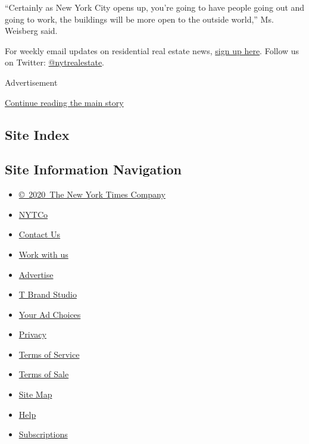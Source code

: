 ``Certainly as New York City opens up, you're going to have people going
out and going to work, the buildings will be more open to the outside
world,'' Ms. Weisberg said.

For weekly email updates on residential real estate news,
\href{http://www.nytimes3xbfgragh.onion/newsletters/realestate/}{sign up
here}. Follow us on Twitter:
\href{https://twitter.com/nytrealestate}{@nytrealestate}.

Advertisement

\protect\hyperlink{after-bottom}{Continue reading the main story}

\hypertarget{site-index}{%
\subsection{Site Index}\label{site-index}}

\hypertarget{site-information-navigation}{%
\subsection{Site Information
Navigation}\label{site-information-navigation}}

\begin{itemize}
\tightlist
\item
  \href{https://help.nytimes3xbfgragh.onion/hc/en-us/articles/115014792127-Copyright-notice}{©~2020~The
  New York Times Company}
\end{itemize}

\begin{itemize}
\tightlist
\item
  \href{https://www.nytco.com/}{NYTCo}
\item
  \href{https://help.nytimes3xbfgragh.onion/hc/en-us/articles/115015385887-Contact-Us}{Contact
  Us}
\item
  \href{https://www.nytco.com/careers/}{Work with us}
\item
  \href{https://nytmediakit.com/}{Advertise}
\item
  \href{http://www.tbrandstudio.com/}{T Brand Studio}
\item
  \href{https://www.nytimes3xbfgragh.onion/privacy/cookie-policy\#how-do-i-manage-trackers}{Your
  Ad Choices}
\item
  \href{https://www.nytimes3xbfgragh.onion/privacy}{Privacy}
\item
  \href{https://help.nytimes3xbfgragh.onion/hc/en-us/articles/115014893428-Terms-of-service}{Terms
  of Service}
\item
  \href{https://help.nytimes3xbfgragh.onion/hc/en-us/articles/115014893968-Terms-of-sale}{Terms
  of Sale}
\item
  \href{https://spiderbites.nytimes3xbfgragh.onion}{Site Map}
\item
  \href{https://help.nytimes3xbfgragh.onion/hc/en-us}{Help}
\item
  \href{https://www.nytimes3xbfgragh.onion/subscription?campaignId=37WXW}{Subscriptions}
\end{itemize}
